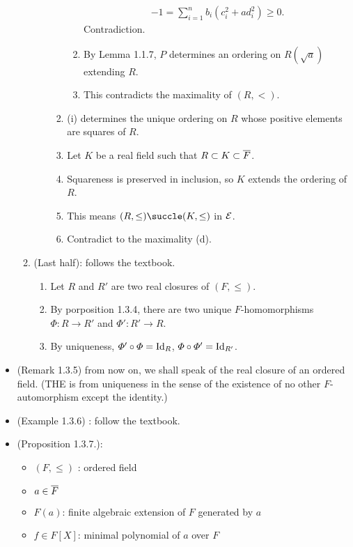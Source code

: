 \documentclass[9pt]{ltjsarticle}
\begin{document}
\begin{itemize}
\begin{enumerate}
\begin{enumerate}
\begin{enumerate}
\begin{enumerate}
\begin{align}
            -1 = \sum_{i=1}^n b_i(c_i^2 + ad_i^2) \ge 0.
          \end{align}
          Contradiction.
          \item
          By Lemma 1.1.7, $P$ determines an ordering on $R(\sqrt{a})$ extending $R$.
          \item
          This contradicts the maximality of $(R,<)$.
        \end{enumerate}
        \item
        (i) determines the unique ordering on $R$ whose positive elements are squares of $R$.
        \item
        Let $K$ be a real field such that $R\subset K \subset \ol F$.
        \item
        Squareness is preserved in inclusion, so $K$ extends the ordering of $R$.
        \item
        This means $(R,\le)\succle (K,\le)$ in $\cal E$.
        \item
        Contradict to the maximality (d).
      \end{enumerate}
    \end{enumerate}
    \item
    (Last half): follows the textbook.
    \begin{enumerate}
      \item Let $R$ and $R'$ are two real closures of $(F,\le)$.
      \item
      By porposition 1.3.4, there are two unique $F$-homomorphisms
      $\varPhi\colon R\to R'$ and $\varPhi'\colon R' \to R$.
      \item
      By uniqueness, $\varPhi'\circ \varPhi = \Id_R$, $\varPhi \circ \varPhi' = \Id_{R'}$.
    \end{enumerate}
  \end{enumerate}

  \item (Remark 1.3.5)
   from now on, we shall speak of the real closure of an ordered field.
  (THE is from uniqueness in the sense of the existence of no other $F$-automorphism except the identity.)
  \item
  (Example 1.3.6) : follow the textbook.
  \item
  (Proposition 1.3.7.):
  \begin{itemize}
    \item $(F,\le)$ : ordered field
    \item $a\in \ol F$
    \item $F(a)$: finite algebraic extension of $F$ generated by $a$
    \item $f\in F[X]$: minimal polynomial of $a$ over $F$
  \end{itemize}
\end{itemize}
\end{document}
